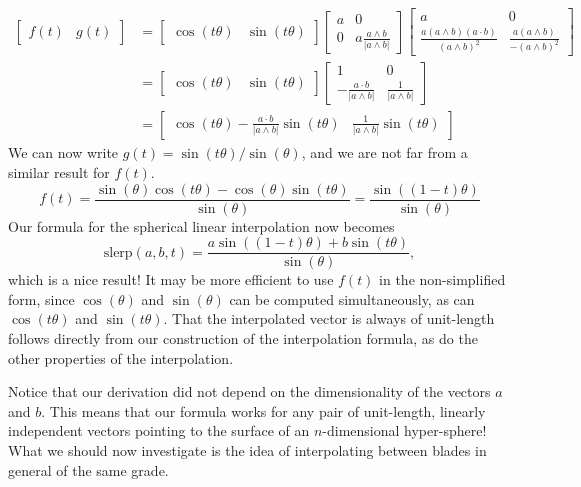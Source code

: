 \documentclass{article}
\begin{document}
\begin{align*}
\left[\begin{array}{cc}f(t)&g(t)\end{array}\right]
 &= \left[\begin{array}{cc}\cos(t\theta)&\sin(t\theta)\end{array}\right]
\left[\begin{array}{cc}a&0\\0&a\frac{a\wedge b}{|a\wedge b|}\end{array}\right]
\left[\begin{array}{cc}a&0\\\frac{a(a\wedge b)(a\cdot b)}{(a\wedge b)^2}&
\frac{a(a\wedge b)}{-(a\wedge b)^2}\end{array}\right] \\
 &= \left[\begin{array}{cc}\cos(t\theta)&\sin(t\theta)\end{array}\right]
\left[\begin{array}{cc}1&0\\-\frac{a\cdot b}{|a\wedge b|}&\frac{1}{|a\wedge b|}\end{array}\right] \\
 &= \left[\begin{array}{cc}\cos(t\theta)-\frac{a\cdot b}{|a\wedge b|}\sin(t\theta)
 & \frac{1}{|a\wedge b|}\sin(t\theta)\end{array}\right]
\end{align*}
We can now write $g(t)=\sin(t\theta)/\sin(\theta)$, and we are not
far from a similar result for $f(t)$.
\begin{equation*}
f(t) = \frac{\sin(\theta)\cos(t\theta)-\cos(\theta)\sin(t\theta)}{\sin(\theta)} =
 \frac{\sin((1-t)\theta)}{\sin(\theta)}
\end{equation*}
Our formula for the spherical linear interpolation now becomes
\begin{equation*}
\mbox{slerp}(a,b,t) = \frac{a\sin((1-t)\theta)+b\sin(t\theta)}{\sin(\theta)},
\end{equation*}
which is a nice result!  It may be more efficient to use
$f(t)$ in the non-simplified form, since $\cos(\theta)$ and $\sin(\theta)$
can be computed simultaneously, as can $\cos(t\theta)$ and $\sin(t\theta)$.
That the interpolated vector is always of unit-length follows directly
from our construction of the interpolation formula, as do the other properties
of the interpolation.

Notice that our derivation did not depend on the dimensionality of
the vectors $a$ and $b$.  This means that our formula works for any
pair of unit-length, linearly independent vectors pointing to the
surface of an $n$-dimensional hyper-sphere!
What we should now investigate is the idea of interpolating between
blades in general of the same grade.
\end{document}
